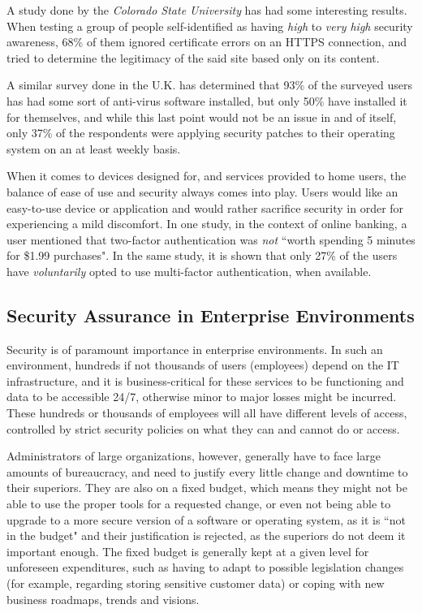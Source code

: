 \documentclass[a4paper,12pt]{article}
\begin{document}
	A study done by the \textit{Colorado State University} has had some interesting\cite{ahowe12} results. When testing a group of people self-identified as having \textit{high} to \textit{very high} security awareness, 68\% of them ignored certificate errors on an HTTPS connection, and tried to determine the legitimacy of the said site based only on its content.
	
	A similar survey done in the U.K. has determined\cite{sfurnell07} that 93\% of the surveyed users has had some sort of anti-virus software installed, but only 50\% have installed it for themselves, and while this last point would not be an issue in and of itself, only 37\% of the respondents were applying security patches to their operating system on an at least weekly basis.
	
	When it comes to devices designed for, and services provided to home users, the balance of ease of use and security always comes into play. Users would like an easy-to-use device or application and would rather sacrifice security in order for experiencing a mild discomfort. In one study, in the context of online banking, a user mentioned that two-factor authentication was \textit{not} ``worth spending 5 minutes for \$1.99 purchases"\cite{ecrist14}. In the same study, it is shown that only 27\% of the users have \textit{voluntarily} opted to use multi-factor authentication, when available.
	
\subsection{Security Assurance in Enterprise Environments}

	Security is of paramount importance in enterprise environments. In such an environment, hundreds if not thousands of users (employees) depend on the IT infrastructure, and it is business-critical for these services to be functioning and data to be accessible 24/7, otherwise minor to major losses might be incurred. These hundreds or thousands of employees will all have different levels of access, controlled by strict security policies on what they can and cannot do or access.
	
	Administrators of large organizations, however, generally have to face large amounts of bureaucracy, and need to justify every little change and downtime to their superiors. They are also on a fixed budget, which means they might not be able to use the proper tools for a requested change, or even not being able to upgrade to a more secure version of a software or operating system, as it is ``not in the budget" and their justification is rejected, as the superiors do not deem it important enough. The fixed budget is generally kept at a given level for unforeseen expenditures, such as having to adapt to possible legislation changes (for example, regarding storing sensitive customer data) or coping with new business roadmaps, trends and visions.\cite{gkreiz06}
	
\end{document}
